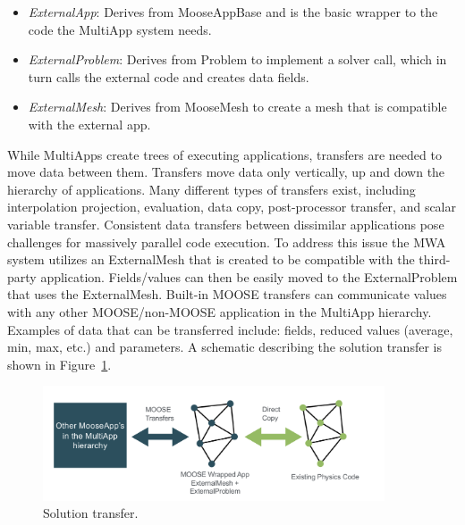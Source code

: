 \begin{itemize}
    \item \textit{ExternalApp}: Derives from MooseAppBase and is the basic wrapper to the code the MultiApp
    system needs.
    \item \textit{ExternalProblem}: Derives from Problem to implement a solver call, which in turn calls the external code and creates data fields.
    \item \textit{ExternalMesh}: Derives from MooseMesh to create a mesh that is compatible with the external app.
\end{itemize}
While MultiApps create trees of executing applications, transfers are needed to move data between them. Transfers move data only vertically, up and down the hierarchy of applications. Many different types of transfers exist, including interpolation projection, evaluation, data copy, post-processor transfer, and scalar variable transfer.
Consistent data transfers between dissimilar applications pose challenges for massively parallel code execution.  To address this issue the MWA system utilizes an ExternalMesh that is created to be compatible with the third-party application. Fields/values can then be easily moved to the ExternalProblem  that uses the ExternalMesh. Built-in MOOSE transfers can communicate values with any other MOOSE/non-MOOSE application in the MultiApp hierarchy.  Examples of data that can be transferred include: fields, reduced values (average, min, max, etc.) and parameters.  A schematic describing the solution transfer is shown in Figure~\ref{f:moose2}.

\begin{figure}[!h]
\centering
\includegraphics[clip=true,width=0.9\textwidth]{Figures/moose2}
\caption{Solution transfer.}
\label{f:moose2}
\end{figure}

